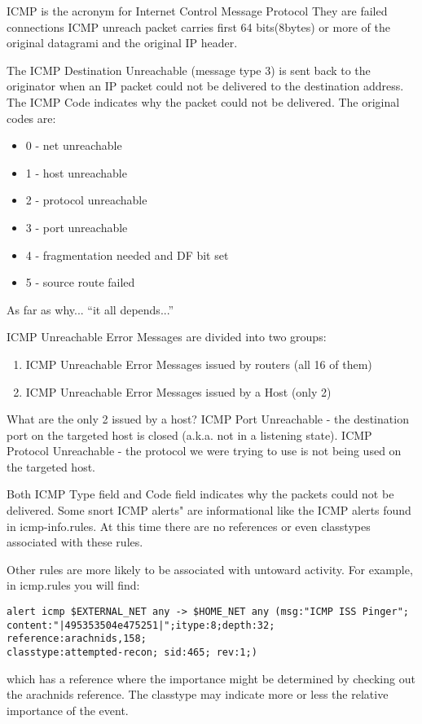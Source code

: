 \documentclass{article}
\begin{document}
ICMP is the acronym for Internet Control Message Protocol
They are failed connections ICMP unreach packet carries first 64
bits(8bytes) or more of the original datagrami and the original IP header.

The ICMP Destination Unreachable (message type 3) is sent back to the
originator when an IP packet could not be delivered to the destination
address.  The ICMP Code indicates why the packet could not be delivered.
The original codes are:

\begin{itemize}
\item0 - net unreachable
\item1 - host unreachable
\item2 - protocol unreachable
\item3 - port unreachable
\item4 - fragmentation needed and DF bit set
\item5 - source route failed
\end{itemize}

As far as why... ``it all depends...''

ICMP Unreachable Error Messages are divided into two groups:
\begin{enumerate}
\item ICMP Unreachable Error Messages issued by routers (all 16 of them)
\item  ICMP Unreachable Error Messages issued by a Host (only 2)
\end{enumerate}

What are the only 2 issued by a host?
ICMP Port Unreachable - the destination port on the targeted host is
                        closed (a.k.a. not in a listening state).
ICMP Protocol Unreachable - the protocol we were trying to use is not
                        being used on the targeted host.


Both ICMP Type field and Code field indicates why the packets could
not be delivered.  Some snort ICMP alerts" are informational like the ICMP
alerts found in icmp-info.rules.  At this time there are no references
or even classtypes associated with these rules.

Other rules are more likely to be associated with untoward activity.  For
example, in icmp.rules you will find:

\begin{verbatim}
alert icmp $EXTERNAL_NET any -> $HOME_NET any (msg:"ICMP ISS Pinger"; 
content:"|495353504e475251|";itype:8;depth:32; reference:arachnids,158; 
classtype:attempted-recon; sid:465; rev:1;)
\end{verbatim}

which has a reference where the importance might be determined by checking
out the arachnids reference.  The classtype may indicate more or
less the relative importance of the event.
\end{document}

